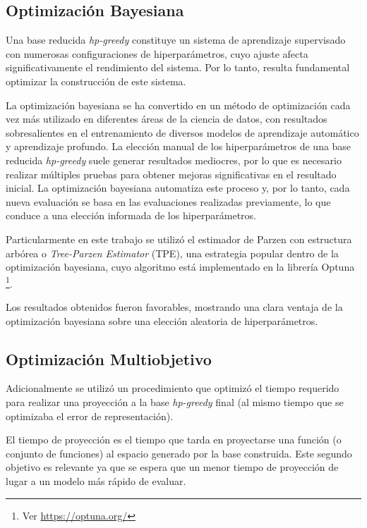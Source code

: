 \subsection*{Optimización Bayesiana}

Una base reducida \textit{hp-greedy} constituye un sistema de aprendizaje supervisado con numerosas configuraciones de hiperparámetros, cuyo ajuste afecta significativamente el rendimiento del sistema. Por lo tanto, resulta fundamental optimizar la construcción de este sistema.

La optimización bayesiana \cite{7352306, https://doi.org/10.48550/arxiv.1012.2599} se ha convertido en un método de optimización cada vez más utilizado en diferentes áreas de la ciencia de datos, con resultados sobresalientes en el entrenamiento de diversos modelos de aprendizaje automático y aprendizaje profundo. La elección manual de los hiperparámetros de una base reducida \textit{hp-greedy} suele generar resultados mediocres, por lo que es necesario realizar múltiples pruebas para obtener mejoras significativas en el resultado inicial. La optimización bayesiana automatiza este proceso y, por lo tanto, cada nueva evaluación se basa en las evaluaciones realizadas previamente, lo que conduce a una elección informada de los hiperparámetros. 

Particularmente en este trabajo se utilizó el estimador de Parzen con estructura arbórea o \textit{Tree-Parzen Estimator} (TPE), una estrategia popular dentro de la optimización bayesiana, cuyo algoritmo está implementado en la librería Optuna \cite{optuna_2019} \footnote{Ver \url{https://optuna.org/}}. 


Los resultados obtenidos fueron favorables, mostrando una clara ventaja de la optimización bayesiana sobre una elección aleatoria de hiperparámetros.

\subsection*{Optimización Multiobjetivo}

Adicionalmente se utilizó un procedimiento que optimizó el tiempo requerido para realizar una proyección a la base \textit{hp-greedy} final (al mismo tiempo que se optimizaba el error de representación).

El tiempo de proyección es el tiempo que tarda en proyectarse una función (o conjunto de funciones) al espacio generado por la base construida. Este segundo objetivo es relevante ya que se espera que un menor tiempo de proyección de lugar a un modelo más rápido de evaluar.





